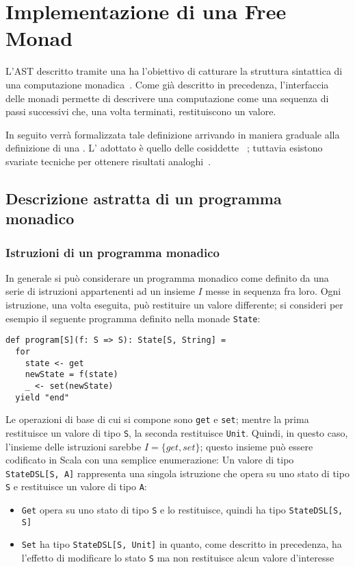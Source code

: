 \section{Implementazione di una Free Monad}

L'AST descritto tramite una  ha l'obiettivo di catturare la struttura sintattica di una computazione monadica~\cite{cit:programming-monads-operationally-with-unimo}.
Come già descritto in precedenza, l'interfaccia delle monadi permette di descrivere una computazione come una sequenza di passi successivi che, una volta terminati, restituiscono un valore.

In seguito verrà formalizzata tale definizione arrivando in maniera graduale alla definizione di una .
L' adottato è quello delle cosiddette ~\cite{cit:programming-monads-operationally-with-unimo}; tuttavia esistono svariate tecniche per ottenere risultati analoghi~\cite{cit:data-types-a-la-carte,cit:freer-monads-more-extensible-effects,cit:fusion-for-free}.

\subsection{Descrizione astratta di un programma monadico}
\subsubsection{Istruzioni di un programma monadico}
In generale si può considerare un programma monadico come definito da una serie di istruzioni appartenenti ad un insieme $I$ messe in sequenza fra loro.
Ogni istruzione, una volta eseguita, può restituire un valore differente; si consideri per esempio il seguente programma definito nella monade \lstinline{State}:
\begin{lstlisting}[language=scala3]
def program[S](f: S => S): State[S, String] =
  for
    state <- get
    newState = f(state)
    _ <- set(newState)
  yield "end"
\end{lstlisting}
Le operazioni di base di cui si compone sono \lstinline{get} e \lstinline{set}; mentre la prima restituisce un valore di tipo \lstinline{S}, la seconda restituisce \lstinline{Unit}.
Quindi, in questo caso, l'insieme delle istruzioni sarebbe $I = \{get, set\}$; questo insieme può essere codificato in Scala con una semplice enumerazione:
Un valore di tipo \lstinline{StateDSL[S, A]} rappresenta una singola istruzione che opera su uno stato di tipo \lstinline{S} e restituisce un valore di tipo \lstinline{A}:
\begin{itemize}
  \item \lstinline{Get} opera su uno stato di tipo \lstinline{S} e lo restituisce, quindi ha tipo \lstinline{StateDSL[S, S]}
  \item \lstinline{Set} ha tipo \lstinline{StateDSL[S, Unit]} in quanto, come descritto in precedenza, ha l'effetto di modificare lo stato \lstinline{S} ma non restituisce alcun valore d'interesse
\end{itemize}

